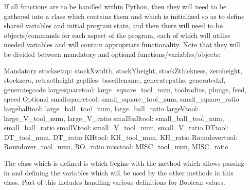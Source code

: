 \documentclass{ltxdoc}
\begin{document}
If all functions are to be handled within Python, then they will need to be gathered into a class which contains them and which is initialized so as to define shared variables and initial program state, and then there will need to be objects/commands for each aspect of the program, each of which will utilise needed variables and will contain appropriate functionality. Note that they will be divided between mandatory and optional functions/variables/objects:

\begin{outline}
\1 Mandatory
   \2 stocksetup:
      \3 stockXwidth, stockYheight, stockZthickness, zeroheight, stockzero, retract\-height
   \2 gcpfiles: 
      \3 basefilename, generatepaths, generatedxf, generategcode
   \2 largesquaretool: 
      \3 large\_square\_tool\_num, toolradius, plunge, feed, speed
\1 Optional
   \2 smallsquaretool: 
      \3small\_square\_tool\_num, small\_square\_ratio
   \2 largeballtool: 
      \3 large\_ball\_tool\_num, large\_ball\_ratio
   \2 largeVtool: 
      \3 large\_V\_tool\_num, large\_V\_ratio
   \2 smallballtool: 
      \3 small\_ball\_tool\_num, small\_ball\_ratio
   \2 smallVtool: 
      \3 small\_V\_tool\_num, small\_V\_ratio
   \2 DTtool: 
      \3 DT\_tool\_num, DT\_ratio
   \2 KHtool: 
      \3 KH\_tool\_num, KH\_ratio
   \2 Roundovertool: 
      \3 Roundover\_tool\_num, RO\_ratio
   \2 misctool: 
      \3 MISC\_tool\_num, MISC\_ratio
\end{outline}

The class which is defined is  which begins with the  method which allows passing in and defining the variables which will be used by the other methods in this class. Part of this includes handling various definitions for Boolean values.
\end{document}
